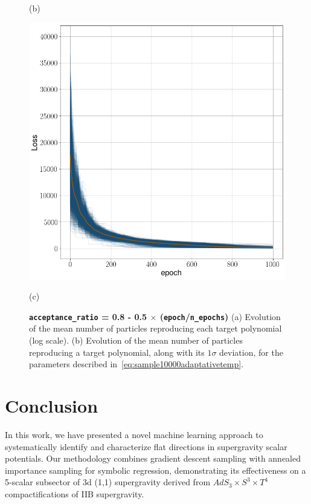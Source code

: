 \documentclass[11pt]{article}
\begin{document}
\begin{figure}[h!]
\begin{adjustbox}{width=20cm,center}
\begin{minipage}[t]{0.31\paperwidth}
			\caption*{(b)}
		\end{minipage}%
		\hfill
		\begin{minipage}[t]{0.31\paperwidth}
			\centering
			\includegraphics[width=\linewidth]{Figures/Loss_all_ASMC.png}
			\caption*{(c)}
		\end{minipage}
	\end{adjustbox}
	\caption{{\bfseries \boldmath \texttt{acceptance\_ratio} = 0.8 - 0.5 $\times$ (\texttt{epoch}/\texttt{n\_epochs})} (a) Evolution of the mean number of particles reproducing each target polynomial (log scale). (b) Evolution of the mean number of particles reproducing a target polynomial, along with its $1\sigma$ deviation, for the parameters described in~\eqref{eq:sample10000adaptativetemp}.}
	\label{fig:evolutionoftargetreproduction}
\end{figure}


\section{Conclusion}

In this work, we have presented a novel machine learning approach to systematically identify and characterize flat directions in supergravity scalar potentials. Our methodology combines gradient descent sampling with annealed importance sampling for symbolic regression, demonstrating its effectiveness on a 5-scalar subsector of 3d (1,1) supergravity derived from 
$AdS_3 \times S^3 \times T^4$ compactifications of IIB supergravity.
\end{document}
